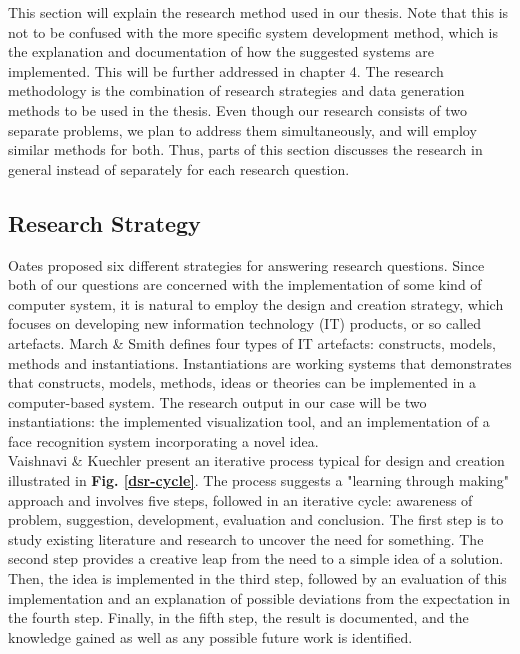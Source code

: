 This section will explain the research method used in our thesis. Note that this is not to be confused with the more specific system development method, which is the explanation and documentation of how the suggested systems are implemented. This will be further addressed in chapter 4. The research methodology is the combination of research strategies and data generation methods to be used in the thesis. Even though our research consists of two separate problems, we plan to address them simultaneously, and will employ similar methods for both. Thus, parts of this section discusses the research in general instead of separately for each research question.

\subsection{Research Strategy}

Oates proposed six different strategies for answering research questions. Since both of our questions are concerned with the implementation of some kind of computer system, it is natural to employ the design and creation strategy, which focuses on developing new information technology (IT) products, or so called artefacts. March \& Smith defines four types of IT artefacts: constructs, models, methods and instantiations. Instantiations are working systems that demonstrates that constructs, models, methods, ideas or theories can be implemented in a computer-based system. The research output in our case will be two instantiations: the implemented visualization tool, and an implementation of a face recognition system incorporating a novel idea. \\

\noindent Vaishnavi \& Kuechler present an iterative process typical for design and creation illustrated in \textbf{Fig. \ref{dsr-cycle}}. The process suggests a "learning through making" approach and involves five steps, followed in an iterative cycle: awareness of problem, suggestion, development, evaluation and conclusion. The first step is to study existing literature and research to uncover the need for something. The second step provides a creative leap from the need to a simple idea of a solution. Then, the idea is implemented in the third step, followed by an evaluation of this implementation and an explanation of possible deviations from the expectation in the fourth step. Finally, in the fifth step, the result is documented, and the knowledge gained as well as any possible future work is identified. \\


